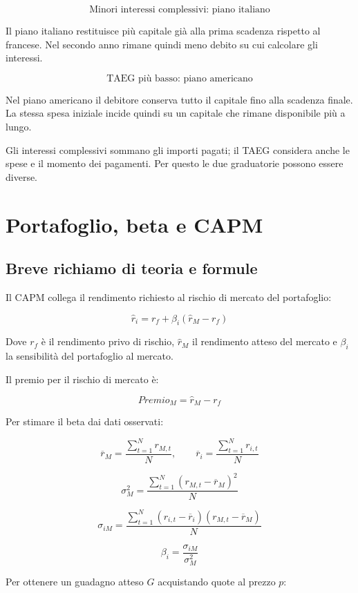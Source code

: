 \[
    \boxed{\text{Minori interessi complessivi: piano italiano}}
\]

\noindent Il piano italiano restituisce più capitale già alla prima
scadenza rispetto al francese. Nel secondo anno rimane
quindi meno debito su cui calcolare gli interessi.

\[
    \boxed{\text{TAEG più basso: piano americano}}
\]

\noindent Nel piano americano il debitore conserva tutto il capitale
fino alla scadenza finale. La stessa spesa iniziale incide
quindi su un capitale che rimane disponibile più a lungo.

\noindent Gli interessi complessivi sommano gli importi pagati;
il TAEG considera anche le spese e il momento dei pagamenti.
Per questo le due graduatorie possono essere diverse.


\section{Portafoglio, beta e CAPM}

\subsection*{Breve richiamo di teoria e formule}

Il CAPM collega il rendimento richiesto al rischio
di mercato del portafoglio:

\[
    \widehat r_i
    =
    r_f+\beta_i(\widehat r_M-r_f)
\]

\noindent Dove $r_f$ è il rendimento privo di rischio,
$\widehat r_M$ il rendimento atteso del mercato
e $\beta_i$ la sensibilità del portafoglio al mercato.

\noindent Il premio per il rischio di mercato è:

\[
    Premio_M=\widehat r_M-r_f
\]

\noindent Per stimare il beta dai dati osservati:

\[
    \overline r_M=\frac{\sum_{t=1}^{N}r_{M,t}}{N},
    \qquad
    \overline r_i=\frac{\sum_{t=1}^{N}r_{i,t}}{N}
\]

\[
    \sigma_M^2
    =
    \frac{\sum_{t=1}^{N}(r_{M,t}-\overline r_M)^2}{N}
\]

\[
    \sigma_{iM}
    =
    \frac{
        \sum_{t=1}^{N}
        (r_{i,t}-\overline r_i)
        (r_{M,t}-\overline r_M)
    }{N}
\]

\[
    \beta_i=\frac{\sigma_{iM}}{\sigma_M^2}
\]

\noindent Per ottenere un guadagno atteso $G$ acquistando quote
al prezzo $p$:

